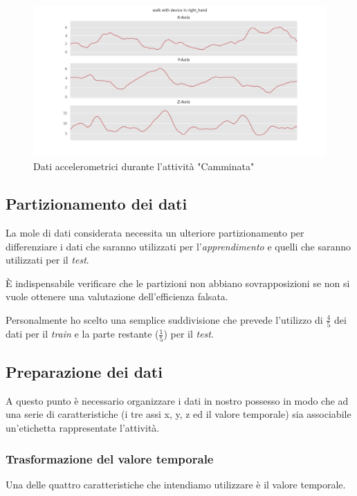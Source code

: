 \begin{figure}[H]
    \centering
    \includegraphics[scale = 0.45]{assets/images/classifications/accelerometer/right_hand/walk-right-hand-acc.png}
    \caption{Dati accelerometrici durante l'attività "Camminata"}
\end{figure}


\newpage
\subsection{Partizionamento dei dati}
La mole di dati considerata necessita un ulteriore partizionamento per differenziare i dati che saranno utilizzati per 
l'\textit{apprendimento} e quelli che saranno utilizzati per il \textit{test}.

È indispensabile verificare che le partizioni non abbiano sovrapposizioni se non si vuole ottenere una valutazione dell'efficienza falsata.

\vspace{5mm} %

Personalmente ho scelto una semplice suddivisione che prevede l'utilizzo di $\frac{4}{5}$ dei dati per il \textit{train} e 
la parte restante ($\frac{1}{5}$) per il \textit{test}.


\subsection{Preparazione dei dati}
\label{section:learning-data-preparation}
A questo punto è necessario organizzare i dati in nostro possesso in modo che 
ad una serie di caratteristiche (i tre assi x, y, z ed il valore temporale) sia associabile un'etichetta 
rappresentate l'attività. 

\subsubsection{Trasformazione del valore temporale}
Una delle quattro caratteristiche che intendiamo utilizzare è il valore temporale.

